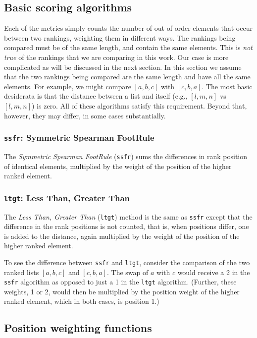 \documentclass{article}
\begin{document}
\subsection{Basic scoring algorithms}

Each of the metrics simply counts the number of out-of-order elements that occur between two rankings, weighting them in different ways. The rankings being compared must be of the same length, and contain the same elements. This is \textit{not true} of the rankings that we are comparing in this work. Our case is more complicated as will be discussed in the next section. In this section we assume that the two rankings being compared are the same length and have all the same elements. For example, we might compare $[a,b,c]$ with $[c,b,a]$. The most basic desiderata is that the distance between a list and itself (e.g., $[l,m,n]$ vs $[l,m,n]$) is zero. All of these algorithms satisfy this requirement. Beyond that, however, they may differ, in some cases substantially.

\subsubsection{\texttt{ssfr}: Symmetric Spearman FootRule}

The \emph{Symmetric Spearman FootRule} (\texttt{ssfr}) sums the differences in rank position of identical elements, multiplied by the weight of the position of the higher ranked element. 

\subsubsection{\texttt{ltgt}: Less Than, Greater Than}

The \emph{Less Than, Greater Than} (\texttt{ltgt}) method is the same as \texttt{ssfr} except that the difference in the rank positions is not counted, that is, when positions differ, one is added to the distance, again multiplied by the weight of the position of the higher ranked element. 

To see the difference between \texttt{ssfr} and \texttt{ltgt}, consider the comparison of the two ranked lists $[a,b,c]$ and $[c,b,a]$. The swap of $a$ with $c$ would receive a 2 in the \texttt{ssfr} algorithm as opposed to just a 1 in the \texttt{ltgt} algorithm. (Further, these weights, 1 or 2, would then be multiplied by the position weight of the higher ranked element, which in both cases, is position 1.)

\subsection{Position weighting functions}
\end{document}
